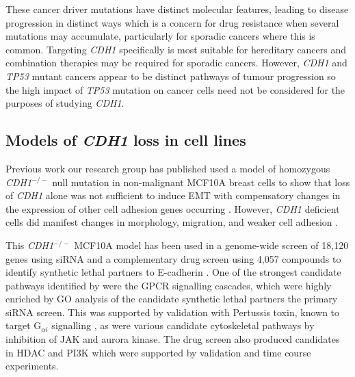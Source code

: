 These cancer driver mutations have distinct molecular features, leading to disease progression in distinct ways which is a concern for drug resistance when several mutations may accumulate, particularly for sporadic cancers where this is common. Targeting \textit{CDH1} specifically is most suitable for hereditary cancers and combination therapies may be required for sporadic cancers. However, \textit{CDH1} and \textit{\textit{TP53}} mutant cancers appear to be distinct pathways of tumour progression so the high impact of \textit{\textit{TP53}} mutation on cancer cells need not be considered for the purposes of studying \textit{CDH1}.

\subsection{Models of \textit{CDH1} loss in cell lines}
Previous work our research group has published used a model of  homozygous \textit{CDH1}$^{-/-}$ null mutation in non-malignant MCF10A breast cells to show that loss of \textit{CDH1} alone was not sufficient to induce \gls{EMT} with compensatory changes in the expression of other cell adhesion genes occurring \citep{Chen2014}. However, \textit{CDH1} deficient cells did manifest changes in morphology, migration, and weaker cell adhesion \citep{Chen2014}.

This \textit{CDH1}$^{-/-}$  MCF10A model has been used in a genome-wide screen of 18,120 genes using \gls{siRNA} and a complementary drug screen using 4,057 compounds to identify \gls{synthetic lethal} partners to \gls{E-cadherin} \citep{Telford2015}. One of the strongest candidate pathways identified by \citet{Telford2015} were the GPCR signalling cascades, which were highly enriched by \gls{GO} analysis of the candidate \gls{synthetic lethal} partners the primary \gls{siRNA} screen. This was supported by validation with Pertussis toxin, known to target  G$_{\alpha i}$ signalling \citep{Clark2004}, as were various candidate cytoskeletal pathways by inhibition of \gls{JAK} and aurora kinase. The drug screen also produced candidates in \gls{HDAC} and \gls{PI3K} which were supported by validation and time course experiments.


